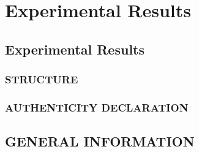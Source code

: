 \chapter{Experimental Results}\label{section:theory}
\thispagestyle{pagestyle}


\section{Experimental Results}
\subsection{STRUCTURE} \label{section:structure}

\subsection{AUTHENTICITY DECLARATION}

\section{GENERAL INFORMATION}
